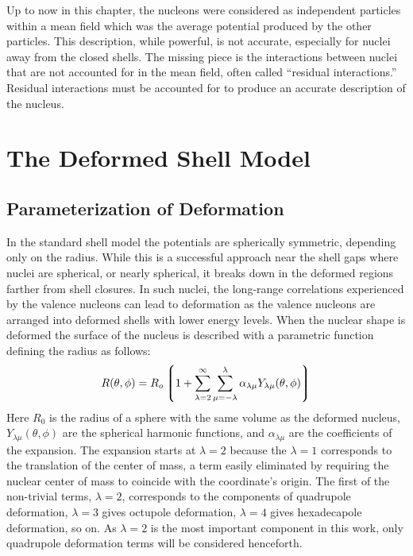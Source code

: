 Up to now in this chapter, the nucleons were considered as independent particles within a mean field which was the average potential produced by the other particles. This description, while powerful, is not accurate, especially for nuclei away from the closed shells. The missing piece is the interactions between nuclei that are not accounted for in the mean field, often called ``residual interactions.'' Residual interactions must be accounted for to produce an accurate description of the nucleus.

\section{The Deformed Shell Model}
\label{sec:models-shell-model-def-sm}
\subsection{Parameterization of Deformation}
\label{ssec:models-shell-model-def-param}
In the standard shell model the potentials are spherically symmetric, depending only on the radius. While this is a successful approach near the shell gaps where nuclei are spherical, or nearly spherical, it breaks down in the deformed regions farther from shell closures. In such nuclei, the long-range correlations experienced by the valence nucleons can lead to deformation as the valence nucleons are arranged into deformed shells with lower energy levels. When the nuclear shape is deformed the surface of the nucleus is described with a parametric function defining the radius as follows:
\begin{equation}
\label{eqn:surface-full-expansion}
R(\theta, \phi) = R_{o}\left \lgroup 1 + \sum_{\lambda = 2}^{\infty}\sum_{\mu = -\lambda}^{\lambda}\alpha_{\lambda \mu} Y_{\lambda \mu}(\theta, \phi)\right \rgroup
\end{equation} 
Here $R_0$ is the radius of a sphere with the same volume as the deformed nucleus, $Y_{\lambda \mu}(\theta, \phi)$ are the spherical harmonic functions, and $\alpha_{\lambda \mu}$ are the coefficients of the expansion. The expansion starts at $\lambda = 2$ because the $\lambda = 1$ corresponds to the translation of the center of mass, a term easily eliminated by requiring the nuclear center of mass to coincide with the coordinate's origin. The first of the non-trivial terms, $\lambda = 2$, corresponds to the components of quadrupole deformation, $\lambda = 3$ gives octupole deformation, $\lambda = 4$ gives hexadecapole deformation, so on. As $\lambda = 2$ is the most important component in this work, only quadrupole deformation terms will be considered henceforth.

